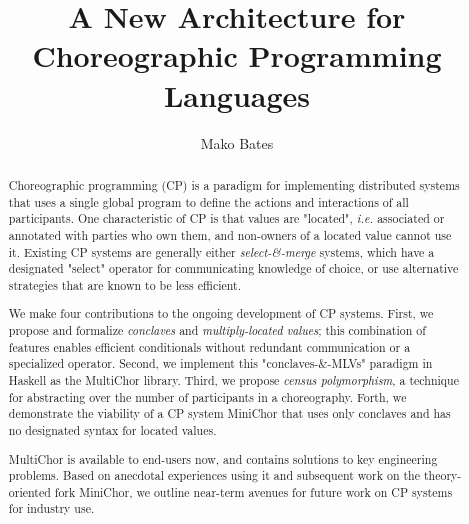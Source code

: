 \documentclass{report}
\title{A New Architecture for\\Choreographic Programming Languages}
\author{Mako Bates}
\newcommand{\ie}{\textit{i.e.}\xspace}
\newcommand{\minichor}{Mini\-Chor\xspace}
\newcommand{\MultiChor}{Multi\-Chor\xspace}
\begin{document}
\maketitle


\begin{abstract}
  Choreographic programming (CP) is a paradigm for implementing
  distributed systems that uses a single global program to define the
  actions and interactions of all participants.
  One characteristic of CP is that values are "located",
  \ie associated or annotated with parties who own them,
  and non-owners of a located value cannot use it.
  Existing CP systems are generally either \emph{select-\&-merge} systems,
  which have a designated "select" operator for communicating knowledge of choice,
  or use alternative strategies that are known to be less efficient.
  
  We make four contributions to the ongoing development of CP systems.
  First, we propose and formalize \emph{conclaves} and \emph{multiply-located values};
  this combination of features enables efficient conditionals
  without redundant communication or a specialized operator.
  Second, we implement this "conclaves-\&-MLVs" paradigm in Haskell as the \MultiChor library.
  Third, we propose
  \emph{census polymorphism}, a technique for abstracting over the
  number of participants in a choreography.
  Forth, we demonstrate the viability of a CP system \minichor that uses only conclaves and has no designated syntax for located values.

  \MultiChor is available to end-users now,
  and contains solutions to key engineering problems.
  Based on anecdotal experiences using it
  and subsequent work on the theory-oriented fork \minichor,
  we outline near-term avenues for future work on CP systems for industry use.
\end{abstract}
\end{document}
